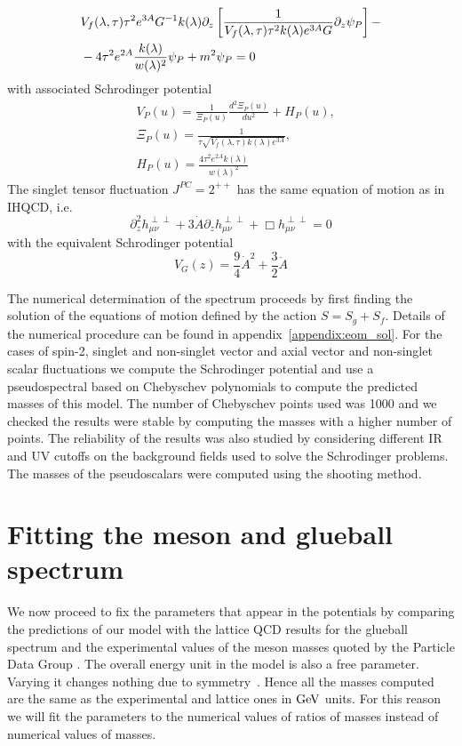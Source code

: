 \documentclass[a4paper,12pt]{article}
\begin{document}
\begin{align}
&V_f(\lambda, \tau) \tau^2 e^{3A} G^{-1} k(\lambda) \partial_z \left[ \frac{1}{V_f(\lambda, \tau) \tau^2 k(\lambda) e^{3A} G} \partial_z \psi_P \right] - \notag \\
& - 4 \tau^2 e^{2A} \frac{k(\lambda)}{w(\lambda)^2} \psi_P + m^2 \psi_P = 0
\end{align}
with associated Schrodinger potential
\begin{align}
&V_P(u) = \frac{1}{\Xi_P(u)} \frac{d^2 \Xi_P(u)}{d u^2} + H_P (u), \\
&\Xi_P(u) = \frac{1}{\tau \sqrt{V_f(\lambda, \tau) k(\lambda) e^{3A}}}, \\
&H_P(u) = \frac{4 \tau^2 e^{2A} k(\lambda)}{w(\lambda)^2}
\end{align}
The singlet tensor fluctuation $J^{PC} = 2^{++}$ has the same equation of motion as in IHQCD, i.e.
\begin{equation}
\partial_z^2 h_{\mu \nu}^{\perp \perp} + 3 \dot{A} \partial_z h_{\mu \nu}^{\perp \perp} + \Box h_{\mu \nu}^{\perp \perp} = 0
\end{equation}
with the equivalent Schrodinger potential
\begin{equation}
V_G (z) = \frac{9}{4} {\dot{A}}^2 + \frac{3}{2} \ddot{A}
\end{equation}

The numerical determination of the spectrum proceeds by first finding the solution of the equations of motion defined by the action $S = S_g + S_f$. Details of the numerical procedure can be found in appendix~\ref{appendix:eom_sol}. For the cases of spin-2, singlet and non-singlet vector and axial vector and non-singlet scalar fluctuations we compute the Schrodinger potential and use a pseudospectral based on Chebyschev polynomials to compute the predicted masses of this model. The number of Chebyschev points used was 1000 and we checked the results were stable by computing the masses with a higher number of points. The reliability of the results was also studied by considering different IR and UV cutoffs on the background fields used to solve the Schrodinger problems. The masses of the pseudoscalars were computed using the shooting method.

\section{Fitting the meson and glueball spectrum}

We now proceed to fix the parameters that appear in the potentials by comparing the predictions of our model with the lattice QCD results for the glueball spectrum and the experimental values of the meson masses quoted by the Particle Data Group \cite{pdg_2020}.  The overall energy unit in the model is also a free parameter. Varying it changes nothing due to symmetry~\cite{Jarvinen:2011qe}. Hence all the masses computed are the same as the experimental and lattice ones in $\rm{GeV}$ units. For this reason we will fit the parameters to the numerical values of ratios of masses instead of numerical values of masses.
\end{document}
